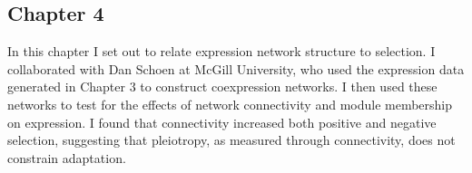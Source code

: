 \subsection{Chapter 4}
	In this chapter I set out to relate expression network structure to selection. I collaborated with Dan Schoen at McGill University, who used the expression data generated in Chapter 3 to construct coexpression networks. I then used these networks to test for the effects of network connectivity and module membership on expression. I found that connectivity increased both positive and negative selection, suggesting that pleiotropy, as measured through connectivity, does not constrain adaptation. 
